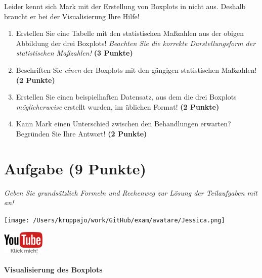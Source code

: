 \documentclass[a4paper, 9pt]{scrartcl}\usepackage[]{graphicx}\usepackage[]{xcolor}
\begin{document}
Leider kennt sich Mark mit der Erstellung von Boxplots in \Rlogo nicht aus. Deshalb braucht er bei der Visualisierung Ihre Hilfe!

\begin{enumerate}
\item Erstellen Sie eine Tabelle mit den statistischen Maßzahlen aus der obigen Abbildung der drei Boxplots! \textit{Beachten Sie die korrekte Darstellungsform der statistischen Maßzahlen!} \textbf{(3 Punkte)}
\item Beschriften Sie \textit{einen} der Boxplots mit den gängigen statistischen Maßzahlen! \textbf{(2 Punkte)}
\item Erstellen Sie einen beispielhaften Datensatz, aus dem die drei Boxplots \textit{möglicherweise} erstellt wurden, im \Rlogo üblichen Format! \textbf{(2 Punkte)}
\item Kann Mark einen Unterschied zwischen den Behandlungen erwarten? Begründen Sie Ihre Antwort! \textbf{(2 Punkte)}
\end{enumerate} 
\clearpage

\section{Aufgabe \hfill (9 Punkte)}

\textit{Geben Sie grundsätzlich Formeln und Rechenweg zur Lösung der Teilaufgaben mit an!} \\[1Ex]
 

 
\begin{minipage}[t]{0.5\textwidth}
\texttt{[image: /Users/kruppajo/work/GitHub/exam/avatare/Jessica.png]}
\end{minipage}
\begin{minipage}[t]{0.5\textwidth}
\hfill
\href{https://youtu.be/0xc0jIPeiyw}{\includegraphics[width = 2cm]{img/youtube}}
\end{minipage}
\vspace{-3ex}



\paragraph{Visualisierung des Boxplots}
\end{document}
